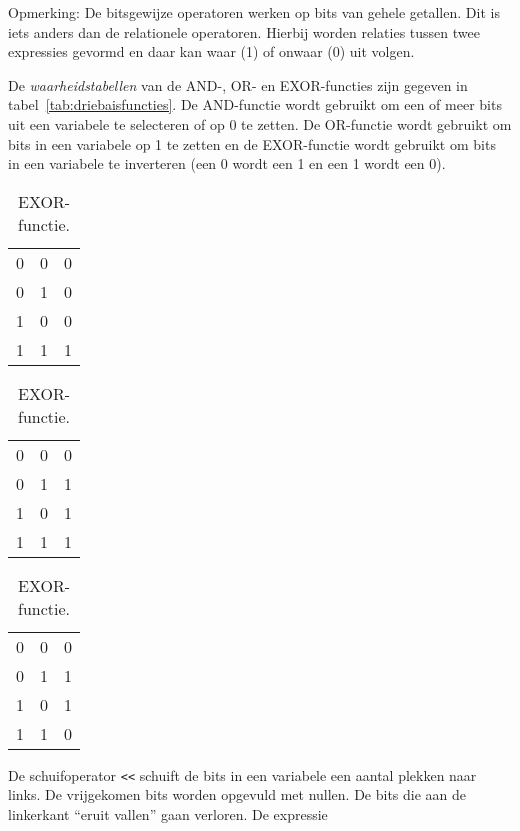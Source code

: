 Opmerking: De bitsgewijze operatoren werken op bits van gehele getallen. Dit is iets anders dan de relationele operatoren. Hierbij worden relaties tussen twee expressies gevormd en daar kan waar (1) of onwaar (0) uit volgen.

De \textsl{waarheidstabellen} van de AND-, OR- en EXOR-functies zijn gegeven in tabel~\ref{tab:driebaisfuncties}. De AND-functie wordt gebruikt om een of meer bits uit een variabele te selecteren of op 0 te zetten. De OR-functie wordt gebruikt om bits in een variabele op 1 te zetten en de EXOR-functie wordt gebruikt om bits in een variabele te inverteren (een 0 wordt een 1 en een 1 wordt een 0).


\begin{table}[!ht]
\centering
\caption{De drie bitsgewijze operatoren.}
\label{tab:driebaisfuncties}
\begin{subtable}[t]{0.333\textwidth}
\centering
\caption{AND-functie.}
\label{tab:enbasisfunctie}
\begin{tabular}{cc|c}
0 & 0 & 0  \\
0 & 1 & 0  \\
1 & 0 & 0  \\
1 & 1 & 1  \\
\end{tabular}
\end{subtable}%
\begin{subtable}[t]{0.333\textwidth}
\centering
\caption{OR-functie.}
\label{tab:ofbasisfunctie}
\begin{tabular}{cc|c}
0 & 0 & 0  \\
0 & 1 & 1  \\
1 & 0 & 1  \\
1 & 1 & 1  \\
\end{tabular}
\end{subtable}%
\begin{subtable}[t]{0.333\textwidth}
\centering
\caption{EXOR-functie.}
\label{tab:exofbasisfunctie}
\begin{tabular}{cc|c}
0 & 0 & 0  \\
0 & 1 & 1  \\
1 & 0 & 1  \\
1 & 1 & 0  \\
\end{tabular}
\end{subtable}
\end{table}

De schuifoperator \texttt{<<} schuift de bits in een variabele een aantal plekken naar links. De vrijgekomen bits worden opgevuld met nullen. De bits die aan de linkerkant ``eruit vallen'' gaan verloren. De expressie

